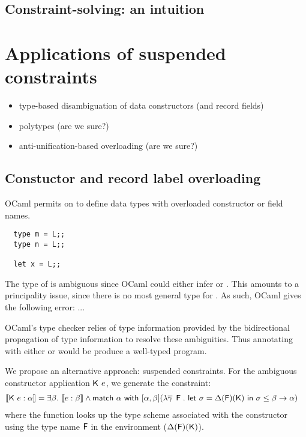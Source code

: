 \documentclass[acmsmall,screen,nonacm]{acmart}
\begin{document}
\subsection{Constraint-solving: an intuition}

\section{Applications of suspended constraints}

\begin{itemize}
\item type-based disambiguation of data constructors (and record fields)
\item polytypes (are we sure?)
\item anti-unification-based overloading (are we sure?)
\end{itemize}

\subsection{Constuctor and record label overloading}

OCaml permits on to define data types with overloaded constructor or field names. 
\begin{lstlisting}
  type m = L;;
  type n = L;;

  let x = L;;
\end{lstlisting}
The type of  is ambiguous since OCaml could either infer  or . This amounts to a principality issue, 
since there is no most general type for . As such, OCaml gives the following error: ... 

OCaml's type checker relies of type information provided by the bidirectional propagation of type information
to resolve these ambiguities. Thus annotating  with either  or  would be produce a well-typed 
program. 

We propose an alternative approach: suspended constraints. For the ambiguous constructor application $\mathsf{K} ~ e$, 
we generate the constraint: 
\begin{align*}
 \llbracket \mathsf{K} ~ e : \alpha \rrbracket &= \exists {\beta}. ~ \llbracket e : \beta \rrbracket \wedge \mathsf{match} ~ \alpha ~ \mathsf{with} ~ [ \alpha, \beta ] (\lambda \overline{\gamma} \mathop{}\mathrel{\mathsf{F}}. ~ \mathsf{let} ~ \sigma = \Delta(\mathsf{F})(\mathsf{K}) ~ \mathsf{in} ~ \sigma \leq \beta \to \alpha )
\end{align*}
where the function looks up the type scheme associated with the constructor using the type name $\mathsf{F}$ in the environment ($\Delta(\mathsf{F})(\mathsf{K})$). 
\end{document}
